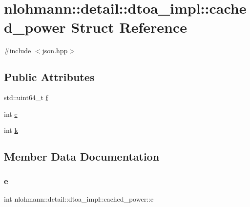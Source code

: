 \hypertarget{structnlohmann_1_1detail_1_1dtoa__impl_1_1cached__power}{}\section{nlohmann\+::detail\+::dtoa\+\_\+impl\+::cached\+\_\+power Struct Reference}
\label{structnlohmann_1_1detail_1_1dtoa__impl_1_1cached__power}


{\ttfamily \#include $<$json.\+hpp$>$}

\subsection*{Public Attributes}
\begin{DoxyCompactItemize}
\item 
std\+::uint64\+\_\+t \mbox{\hyperlink{structnlohmann_1_1detail_1_1dtoa__impl_1_1cached__power_a21ae81f515f5b08d5bf423775ee56074}{f}}
\item 
int \mbox{\hyperlink{structnlohmann_1_1detail_1_1dtoa__impl_1_1cached__power_a9e89bc89bb7bf4361f43ea27eed91d23}{e}}
\item 
int \mbox{\hyperlink{structnlohmann_1_1detail_1_1dtoa__impl_1_1cached__power_a8c1f2efed643eeaa8fae83c697a29c6a}{k}}
\end{DoxyCompactItemize}


\subsection{Member Data Documentation}
\mbox{\label{structnlohmann_1_1detail_1_1dtoa__impl_1_1cached__power_a9e89bc89bb7bf4361f43ea27eed91d23}} 
\subsubsection{\texorpdfstring{e}{e}}
{\footnotesize\ttfamily int nlohmann\+::detail\+::dtoa\+\_\+impl\+::cached\+\_\+power\+::e}

\mbox{\label{structnlohmann_1_1detail_1_1dtoa__impl_1_1cached__power_a21ae81f515f5b08d5bf423775ee56074}} 
